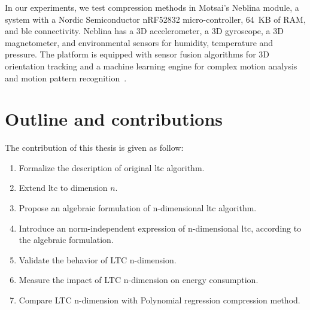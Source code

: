 
In our experiments, we test compression methods in Motsai's Neblina module, a
system with a Nordic Semiconductor nRF52832 micro-controller, 64~KB of RAM, and
\acrlong{ble} connectivity. Neblina has a 3D accelerometer, a 3D
gyroscope, a 3D magnetometer, and environmental sensors for humidity,
temperature and pressure. The platform is equipped with sensor fusion algorithms
for 3D orientation tracking and a machine learning engine for complex motion
analysis and motion pattern recognition~\cite{sarbishei2016accuracy}.


\section{Outline and contributions}





The contribution of this thesis is given as follow:
\begin{enumerate}
  \item Formalize the description of original \acrshort{ltc} algorithm.
  \item Extend \acrshort{ltc} to dimension $n$.
  \item Propose an algebraic formulation of n-dimensional \acrshort{ltc}
  algorithm.
  \item Introduce an norm-independent expression of n-dimensional
  \acrshort{ltc}, according to the algebraic formulation.
  \item Validate the behavior of LTC n-dimension.
  \item Measure the impact of LTC n-dimension on energy consumption.
  \item Compare LTC n-dimension with Polynomial regression compression method.
\end{enumerate}

